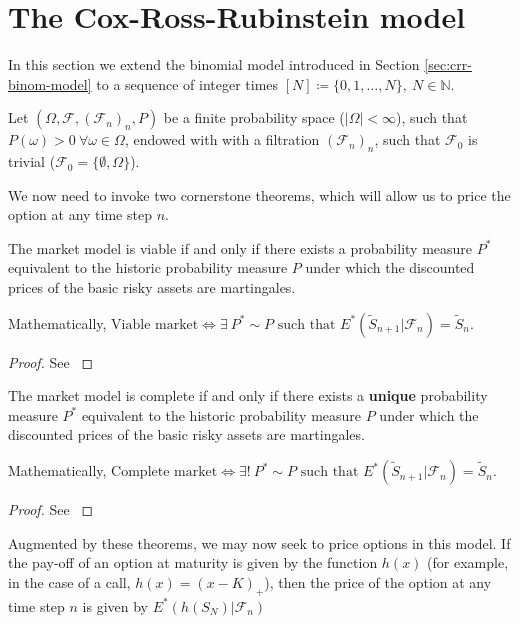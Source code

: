 \section{The Cox-Ross-Rubinstein model}
\label{sec:cox-ross-rubinstein}

In this section we extend the binomial model introduced in Section \ref{sec:crr-binom-model} to a sequence of integer times $ [N] \coloneqq \{ 0, 1, \dots, N \}, \  N \in \mathbb{N} $.

Let $ (\Omega, \mathcal{F}, (\mathcal{F}_n)_n, P) $ be a finite probability space ($ |\Omega| < \infty $), such that $ P(\omega) > 0 \  \forall \omega \in \Omega $, endowed with with a filtration $ (\mathcal{F}_n)_n $, such that $ \mathcal{F}_0 $ is trivial ($ \mathcal{F}_0 = \{ \emptyset, \Omega \} $).

We now need to invoke two cornerstone theorems, which will allow us to price the option at any time step $ n $.

\begin{thm}
	The market model is viable if and only if there exists a probability measure $ P^* $ equivalent to the historic probability measure $ P $ under which the discounted prices of the basic risky assets are martingales.
	
	Mathematically,
	$ \text{Viable market} \iff \exists \  P^* \sim P \text{ such that } E^*( \tilde{S}_{n+1} | \mathcal{F}_n ) = \tilde{S}_{n} $.
\end{thm}

\begin{proof}
	See \cite[page 6, Theorem 1.2.7]{Lamberton1996}
\end{proof}


\begin{thm}
	The market model is complete if and only if there exists a \textbf{unique} probability measure $ P^* $ equivalent to the historic probability measure $ P $ under which the discounted prices of the basic risky assets are martingales.
	
	Mathematically,
	$ \text{Complete market} \iff \exists! \  P^* \sim P \text{ such that } E^*( \tilde{S}_{n+1} | \mathcal{F}_n ) = \tilde{S}_{n} $.
\end{thm}

\begin{proof}
	See \cite[page 9, Theorem 1.3.4]{Lamberton1996}
\end{proof}

Augmented by these theorems, we may now seek to price options in this model. If the pay-off of an option at maturity is given by the function $ h(x) $ (for example, in the case of a call, $ h(x) = (x - K)_+ $), then the price of the option at any time step $ n $ is given by $ E^*( h(S_N) | \mathcal{F}_n ) $



